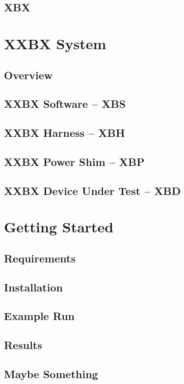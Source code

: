 \documentclass[twoside,11pt]{cergdoc}
\begin{document}
  \section{XBX}
\chapter{XXBX System}
  \section{Overview}
  \section{XXBX Software -- XBS}
  \section{XXBX Harness -- XBH}
  \section{XXBX Power Shim -- XBP}
  \section{XXBX Device Under Test -- XBD}
\chapter{Getting Started}
  \section{Requirements}
  \section{Installation}
  \section{Example Run}
  \section{Results}

\begin{appendix}
\chapter{Maybe Something}
\end{appendix}
\end{document}
